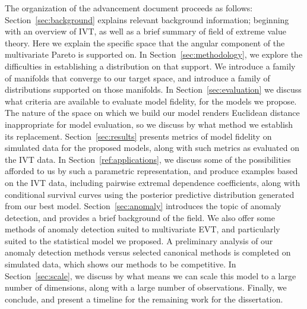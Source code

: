 The organization of the advancement document proceeds as follows:
  Section~\ref{sec:background} explains relevant background information; beginning with an overview of
  IVT, as well as a brief summary of field of extreme value theory.  Here we explain the specific space
  that the angular component of the multivariate Pareto is supported on. In Section~\ref{sec:methodology},
  we explore the difficulties in establishing a distribution on that support.  We introduce a family of
  manifolds that converge to our target space, and introduce a family of distributions supported on those
  manifolds.  In Section~\ref{sec:evaluation} we discuss what criteria are available to evaluate model
  fidelity, for the models we propose.  The nature of the space on which we build our model renders Euclidean
  distance inappropriate for model evaluation, so we discuss by what method we establish its replacement.
  Section~\ref{sec:results} presents metrics of model fidelity on simulated data for the proposed models,
  along with such metrics as evaluated on the IVT data.  In Section~\ref{ref:applications}, we discuss
  some of the possibilities afforded to us by such a parametric representation, and produce examples
  based on the IVT data, including pairwise extremal dependence coefficients, along with conditional
  survival curves using the posterior predictive distribution generated from our best model.
  Section~\ref{sec:anomaly} introduces the topic of anomaly detection, and provides a brief background
  of the field.  We also offer some methods of anomaly detection suited to multivariate EVT, and
  particularly suited to the statistical model we proposed. A preliminary analysis of our anomaly
  detection methods versus selected canonical methods is completed on simulated data, which shows
  our methods to be competitive.  In Section~\ref{sec:scale}, we discuss by what means we can scale
  this model to a large number of dimensions, along with a large number of observations.  Finally, we
  conclude, and present a timeline for the remaining work for the dissertation.

